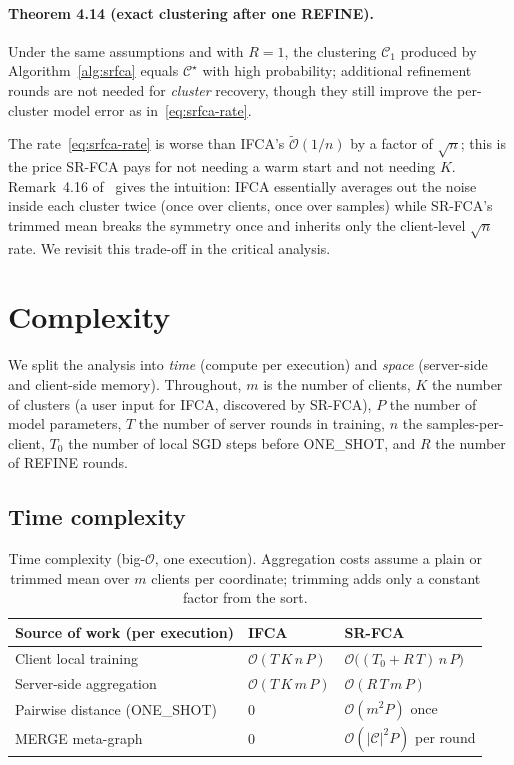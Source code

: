 \paragraph{Theorem 4.14 (exact clustering after one REFINE).} Under the same assumptions and with $R=1$, the clustering $\mathcal{C}_1$ produced by Algorithm~\ref{alg:srfca} equals $\mathcal{C}^\star$ with high probability; additional refinement rounds are not needed for \emph{cluster} recovery, though they still improve the per-cluster model error as in~\eqref{eq:srfca-rate}.

The rate~\eqref{eq:srfca-rate} is worse than IFCA's $\tilde{\mathcal{O}}(1/n)$ by a factor of $\sqrt{n}$; this is the price SR-FCA pays for not needing a warm start and not needing $K$. Remark~4.16 of~\parencite{vardhan2024srfca} gives the intuition: IFCA essentially averages out the noise inside each cluster twice (once over clients, once over samples) while SR-FCA's trimmed mean breaks the symmetry once and inherits only the client-level $\sqrt{n}$ rate. We revisit this trade-off in the critical analysis.

\section{Complexity}\label{sec:complexity}

We split the analysis into \emph{time} (compute per execution) and \emph{space} (server-side and client-side memory). Throughout, $m$ is the number of clients, $K$ the number of clusters (a user input for IFCA, discovered by SR-FCA), $P$ the number of model parameters, $T$ the number of server rounds in training, $n$ the samples-per-client, $T_0$ the number of local SGD steps before ONE\_SHOT, and $R$ the number of REFINE rounds.

\subsection{Time complexity}\label{sec:time-complexity}

\begin{table}[h]
\centering
\small
\begin{tabular}{lll}
\toprule
Source of work (per execution) & IFCA & SR-FCA \\
\midrule
Client local training          & $\mathcal{O}(T\,K\,n\,P)$       & $\mathcal{O}\bigl((T_0 + R\,T)\,n\,P\bigr)$ \\
Server-side aggregation        & $\mathcal{O}(T\,K\,m\,P)$       & $\mathcal{O}(R\,T\,m\,P)$ \\
Pairwise distance (ONE\_SHOT)  & $0$                             & $\mathcal{O}(m^2 P)$ once \\
MERGE meta-graph               & $0$                             & $\mathcal{O}(|\mathcal{C}|^2 P)$ per round \\
\bottomrule
\end{tabular}
\caption{Time complexity (big-$\mathcal{O}$, one execution). Aggregation costs assume a plain or trimmed mean over $m$ clients per coordinate; trimming adds only a constant factor from the sort.}\label{tab:complexity-time}
\end{table}

